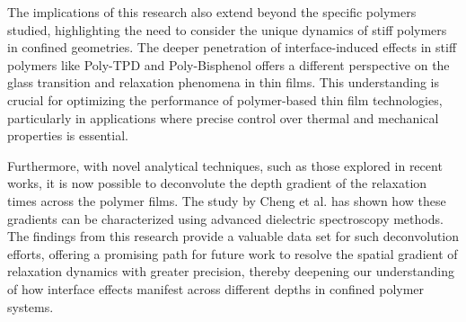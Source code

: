 The implications of this research also extend beyond the specific polymers studied, highlighting the need to consider the unique dynamics of stiff polymers in confined geometries. The deeper penetration of interface-induced effects in stiff polymers like Poly-TPD and Poly-Bisphenol offers a different perspective on the glass transition and relaxation phenomena in thin films. This understanding is crucial for optimizing the performance of polymer-based thin film technologies, particularly in applications where precise control over thermal and mechanical properties is essential.

Furthermore, with novel analytical techniques, such as those explored in recent works, it is now possible to deconvolute the depth gradient of the relaxation times across the polymer films. The study by Cheng et al. \cite{cheng2024} has shown how these gradients can be characterized using advanced dielectric spectroscopy methods. The findings from this research provide a valuable data set for such deconvolution efforts, offering a promising path for future work to resolve the spatial gradient of relaxation dynamics with greater precision, thereby deepening our understanding of how interface effects manifest across different depths in confined polymer systems.




\noindent
